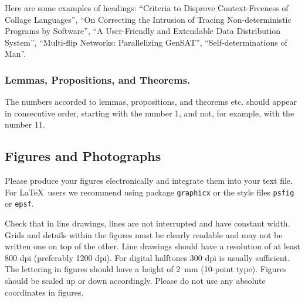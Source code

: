 \documentclass[runningheads]{llncs}
\begin{document}
Here are some examples of headings: ``Criteria to Disprove Context-Freeness of
Collage Languages'', ``On Correcting the Intrusion of Tracing
Non-deterministic Programs by Software'', ``A User-Friendly and
Extendable Data Distribution System'', ``Multi-flip Networks:
Parallelizing GenSAT'', ``Self-determinations of Man''.

\subsubsection{Lemmas, Propositions, and Theorems.}

The numbers accorded to lemmas, propositions, and theorems etc. should
appear in consecutive order, starting with the number 1, and not, for
example, with the number 11.

\subsection{Figures and Photographs}
\label{sect:figures}

Please produce your figures electronically and integrate
them into your text file. For \LaTeX\ users we recommend using package
\verb+graphicx+ or the style files \verb+psfig+ or \verb+epsf+.

Check that in line drawings, lines are not
interrupted and have constant width. Grids and details within the
figures must be clearly readable and may not be written one on top of
the other. Line drawings should have a resolution of at least 800 dpi
(preferably 1200 dpi).
For digital halftones 300 dpi is usually sufficient.
The lettering in figures should have a height of 2~mm (10-point type).
Figures should be scaled up or down accordingly.
Please do not use any absolute coordinates in figures.
\end{document}
